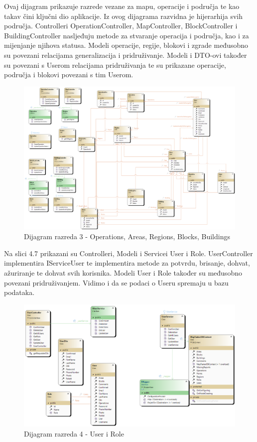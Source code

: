 		\eject
		
		Ovaj dijagram prikazuje razrede vezane za mapu, operacije i područja te kao takav čini ključni dio aplikacije. Iz ovog dijagrama razvidna je hijerarhija svih područja. Controlleri OperationController, MapController, BlockController i BuildingController nasljeđuju metode za stvaranje operacija i područja, kao i za mijenjanje njihova statusa. Modeli operacije, regije, blokovi i zgrade međusobno su povezani relacijama generalizacija i pridruživanje. Modeli i DTO-ovi također su povezani s Userom relacijama pridruživanja te su prikazane operacije, područja i blokovi povezani s tim Userom.
		
			\begin{figure}[h!] \includegraphics[width=\linewidth]{dijagrami/CD-AreasOperations.png}
				\caption{Dijagram razreda 3 - Operations, Areas, Regions, Blocks, Buildings}
			\end{figure}
		
		\eject
		
		Na slici 4.7 prikazani su Controlleri, Modeli i Servicei User i Role. UserController implementira IServiceUser te implementira metode za potvrdu, brisanje, dohvat, ažuriranje te dohvat svih korisnika. Modeli User i Role također su međusobno povezani pridruživanjem. Vidimo i da se podaci o Useru spremaju u bazu podataka.
		
			\begin{figure}[h!] \includegraphics[width=\linewidth]{dijagrami/CD-UserRole.png}
				\caption{Dijagram razreda 4 - User i Role}
			\end{figure}
		
